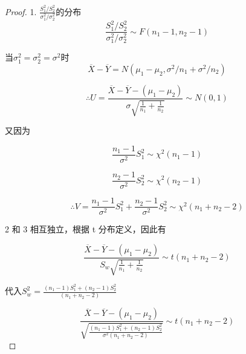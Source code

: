 \begin{proof}

    1. $\frac{S_1^2/S^2_2}{\sigma_1^2 / \sigma_2^2}$的分布
    \begin{equation}
        {
                \frac{S_1^2/S^2_2}{\sigma_1^2 / \sigma_2^2} \sim F(n_1 - 1, n_2 -1)}
    \end{equation}

    当$\sigma^2_1 = \sigma^2_2= \sigma^2$时
    \begin{equation}
        \overline{X} - \overline{Y} = N(\mu_1-\mu_2, \sigma^2 / n_1 + \sigma^2 /n_2)
    \end{equation}

    \begin{equation}
        \therefore U = \frac{\overline{X} - \overline{Y}- (\mu_1 - \mu_2 )}{\sigma \sqrt{ \frac{1}{n_1} + \frac{1}{n_2} }} \sim N(0,1)
    \end{equation}


    又因为

    \begin{equation}
        \frac{n_1 -1}{\sigma^2}S_1^2 \sim \chi^2(n_1 - 1)
    \end{equation}

    \begin{equation} \frac{n_2 -1}{\sigma^2}S_2^2 \sim \chi^2(n_2 - 1) \end{equation}

    \begin{equation}
        \therefore
        V=\frac{n_1 -1}{\sigma^2}S_1^2 + \frac{n_2 -1}{\sigma^2}S_2^2 \sim \chi^2(n_1 + n_2 -2)
    \end{equation}

    2 和 3 相互独立，根据 t 分布定义，因此有

    \begin{equation}
        \frac{\overline{X} - \overline{Y}- (\mu_1 - \mu_2 )}{S_w \sqrt{ \frac{1}{n_1} + \frac{1}{n_2} }} \sim t(n_1+n_2-2)
    \end{equation}

    代入$S_w^2 = \frac{(n_1 - 1) S_1^2 + (n_2 - 1 ) S_2^2  }{ (n_1+n_2-2)}$

    \begin{equation}
        \frac{\overline{X} - \overline{Y}- (\mu_1 - \mu_2 )}{\sqrt{ \frac{(n_1 - 1) S_1^2 + (n_2 - 1 ) S_2^2 }{\sigma^2 (n_1+n_2-2)} }} \sim t(n_1+n_2-2)
    \end{equation}
\end{proof}